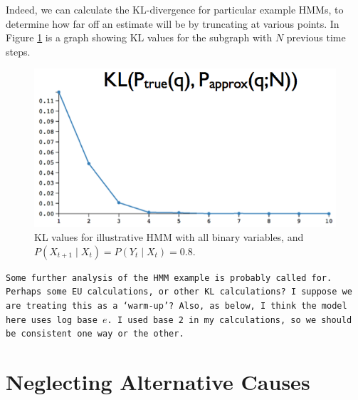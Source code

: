 \documentclass[10pt,letterpaper]{article}
\begin{document}
Indeed, we can calculate the KL-divergence for particular example HMMs, to determine how far off an estimate will be by truncating at various points. In Figure \ref{hmm} is a graph showing KL values for the subgraph with $N$ previous time steps.


\begin{center} \begin{figure}[h]
\includegraphics[scale=0.42]{hmm.png} \caption{KL values for illustrative HMM with all binary variables, and $P(X_{t+1}\mid X_t) = P(Y_t\mid X_t) = 0.8$.} \label{hmm}
\end{figure} 
\end{center}
\texttt{Some further analysis of the HMM example is probably called for. Perhaps some EU calculations, or other KL calculations? I suppose we are treating this as a `warm-up'? Also, as below, I think the model here uses log base $e$. I used base 2 in my calculations, so we should be consistent one way or the other.}

\section{Neglecting Alternative Causes}
\end{document}
